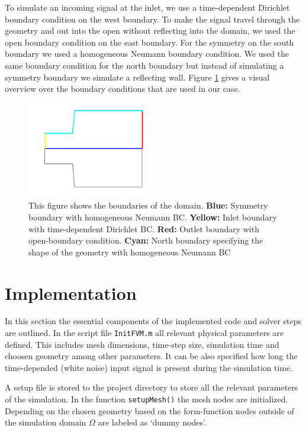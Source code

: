 \documentclass[fleqn,12pt]{NTFD} %
\begin{document}
To simulate an incoming signal at the inlet, we use a time-dependent Dirichlet boundary condition on the west boundary. To make the signal travel through the geometry and out into the open without reflecting into the domain, we used the open boundary condition on the east boundary. For the symmetry on the south boundary we used a homogeneous Neumann boundary condition. We used the same boundary condition for the north boundary but instead of simulating a symmetry boundary we simulate a reflecting wall. Figure \ref{fig:boundary} gives a visual overview over the boundary conditions that are used in our case.
\begin{figure}
    \centering
    \includegraphics[width=0.5\textwidth]{boundary.png}
    \caption{This figure shows the boundaries of the domain. \textbf{Blue:} Symmetry boundary with homogeneous Neumann BC. \textbf{Yellow:} Inlet boundary with time-dependent Dirichlet BC. \textbf{Red:} Outlet boundary with open-boundary condition. \textbf{Cyan:} North boundary specifying the shape of the geometry with homogeneous Neumann BC}
    \label{fig:boundary}
\end{figure}


\section{Implementation}
In this section the essential components of the implemented code and solver steps are outlined.
In the script file \texttt{InitFVM.m} all relevant physical parameters are defined. This includes mesh dimensions, time-step size, simulation time and choosen geometry among other parameters. It can be also specified how long the time-depended (white noise) input signal is present during the simulation time. 

A setup file is stored to the project directory to store all the relevant parameters of the simulation.
In the function \texttt{setupMesh()} the mesh nodes are initialized. Depending on the chosen geometry based on the form-function nodes outside of the simulation domain $\Omega$ are labeled as `dummy nodes'. 
\end{document}
